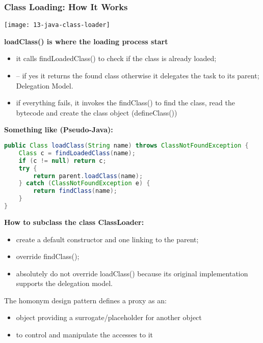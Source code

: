 \subsubsection{Class Loading: How It Works}

\begin{center}
\texttt{[image: 13-java-class-loader]}
\end{center}

\textbf{loadClass() is where the loading process start}
\begin{itemize}
	\item it calls findLoadedClass() to check if the class is already loaded;
	\item– if yes it returns the found class otherwise it delegates the task to its parent; Delegation Model.
	\item if everything fails, it invokes the findClass() to find the class, read the bytecode and create the class object (defineClass())
\end{itemize}

\textbf{Something like (Pseudo-Java):}
\begin{lstlisting}[language=Java]
public Class loadClass(String name) throws ClassNotFoundException {
	Class c = findLoadedClass(name);
	if (c != null) return c;
	try {
		return parent.loadClass(name);
	} catch (ClassNotFoundException e) {
		return findClass(name);
	}
}
\end{lstlisting}

\textbf{How to subclass the class ClassLoader:}

\begin{itemize}
	\item create a default constructor and one linking to the parent;
	\item override findClass();
	\item absolutely do not override loadClass() because its original implementation supports the delegation model.
\end{itemize}





The homonym design pattern defines a proxy as an:

\begin{itemize}
	\item object providing a surrogate/placeholder for another object
	\item to control and manipulate the accesses to it
\end{itemize}

